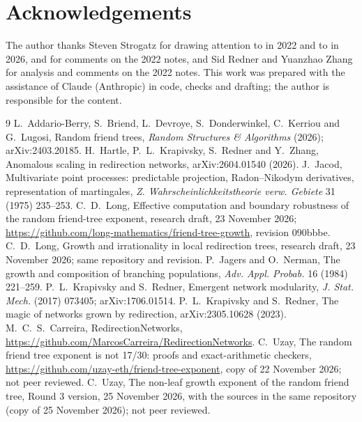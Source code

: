 \documentclass[11pt]{article}
\theoremstyle{plain}
\theoremstyle{definition}
\theoremstyle{remark}
\begin{document}
\section*{Acknowledgements}
The author thanks Steven Strogatz for drawing attention to \cite{KR2017} in 2022 and to \cite{Uzay2026} in 2026, and for comments on the 2022 notes, and Sid Redner and Yuanzhao Zhang for analysis and comments on the 2022 notes. This work was prepared with the assistance of Claude (Anthropic) in code, checks and drafting; the author is responsible for the content.

\begin{thebibliography}{9}
 L.~Addario-Berry, S.~Briend, L.~Devroye, S.~Donderwinkel, C.~Kerriou and G.~Lugosi, Random friend trees, \emph{Random Structures \& Algorithms} (2026); arXiv:2403.20185.
 H.~Hartle, P.~L.~Krapivsky, S.~Redner and Y.~Zhang, Anomalous scaling in redirection networks, arXiv:2604.01540 (2026).
 J.~Jacod, Multivariate point processes: predictable projection, Radon--Nikodym derivatives, representation of martingales, \emph{Z. Wahrscheinlichkeitstheorie verw. Gebiete} 31 (1975) 235--253.
 C.~D.~Long, Effective computation and boundary robustness of the random friend-tree exponent, research draft, 23 November 2026; \url{https://github.com/long-mathematics/friend-tree-growth}, revision 090bbbe.
 C.~D.~Long, Growth and irrationality in local redirection trees, research draft, 23 November 2026; same repository and revision.
 P.~Jagers and O.~Nerman, The growth and composition of branching populations, \emph{Adv. Appl. Probab.} 16 (1984) 221--259.
 P.~L.~Krapivsky and S.~Redner, Emergent network modularity, \emph{J. Stat. Mech.} (2017) 073405; arXiv:1706.01514.
 P.~L.~Krapivsky and S.~Redner, The magic of networks grown by redirection, arXiv:2305.10628 (2023).
 M.~C.~S.~Carreira, RedirectionNetworks, \url{https://github.com/MarcosCarreira/RedirectionNetworks}.
 C.~Uzay, The random friend tree exponent is not 17/30: proofs and exact-arithmetic checkers, \url{https://github.com/uzay-eth/friend-tree-exponent}, copy of 22 November 2026; not peer reviewed.
 C.~Uzay, The non-leaf growth exponent of the random friend tree, Round 3 version, 25 November 2026, with the sources in the same repository (copy of 25 November 2026); not peer reviewed.
\end{thebibliography}
\end{document}
